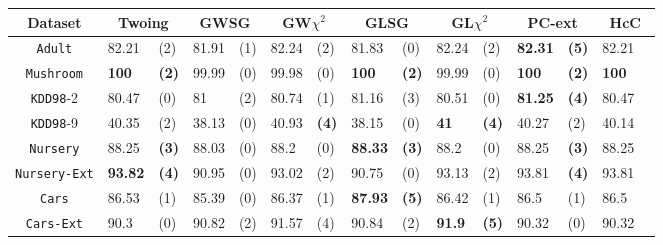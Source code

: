 \begin{table*}[t]
\tiny 
\centering
\begin{tabularx}{\textwidth}{c|XX|XX|XX|XX|XX|XX|XX} 
Dataset & \multicolumn{2}{c|}{Twoing} &  \multicolumn{2}{c|}{GWSG}  
&   \multicolumn{2}{c|}{GW$\chi^2$}                   &\multicolumn{2}{c|}{GLSG}       &\multicolumn{2}{c|}{GL$\chi^2$} & \multicolumn{2}{c|}{PC-ext} & \multicolumn{2}{c}{HcC}\\  \hline 
{\tt Adult}         & 82.21    & (2)    & 81.91    & (1)    & 82.24    & (2)    & 81.83    & (0)    & 82.24    & (2)    &{\bf82.31}&{\bf(5)}         & 82.21    &    \\
{\tt Mushroom}      & {\bf 100}&{\bf(2)}& 99.99    & (0)    & 99.98    & (0)    &{\bf  100}&{\bf(2)}& 99.99    & (0)    &{\bf 100} &{\bf(2)}         &{\bf100}  &    \\
{\tt KDD98}-2       & 80.47    & (0)    & 81       & (2)    & 80.74    & (1)    & 81.16    & (3)    & 80.51    & (0)    &{\bf81.25}&{\bf(4)}         & 80.47    &    \\
{\tt KDD98}-9       & 40.35    & (2)    & 38.13    & (0)    & 40.93    &{\bf(4)}& 38.15    & (0)    &{\bf 41 } &{\bf(4)}& 40.27    & (2)             & 40.14    &    \\
{\tt Nursery}       & 88.25    &{\bf(3)}& 88.03    & (0)    & 88.2     & (0)    &{\bf88.33}&{\bf(3)}& 88.2     & (0)    & 88.25    &{\bf(3)}         & 88.25    &    \\
{\tt Nursery-Ext}   &{\bf93.82}&{\bf(4)}& 90.95    & (0)    & 93.02    & (2)    & 90.75    & (0)    & 93.13    & (2)    & 93.81    &{\bf(4)}         & 93.81    &    \\
{\tt Cars}          & 86.53    & (1)    & 85.39    & (0)    & 86.37    & (1)    &{\bf87.93}&{\bf(5)}& 86.42    & (1)    & 86.5     & (1)             & 86.5     &    \\
{\tt Cars-Ext}      & 90.3     & (0)    & 90.82    & (2)    & 91.57    & (4)    & 90.84    & (2)    &{\bf 91.9}&{\bf(5)}& 90.32    & (0)             & 90.32    &    \\

\end{tabularx}
\end{table*}
